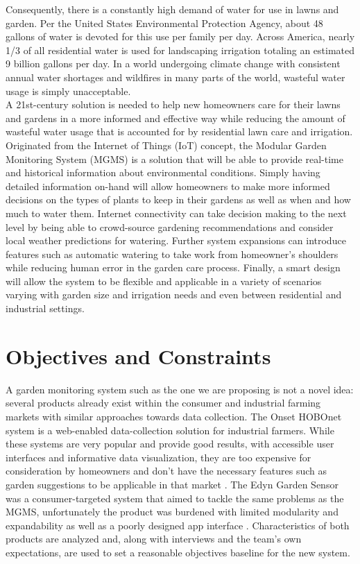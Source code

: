 \documentclass{report}
\begin{document}
Consequently, there is a constantly high demand of water for use in lawns and garden. Per the United States Environmental Protection Agency, about 48 gallons of water is devoted for this use per family per day. Across America, nearly 1/3 of all residential water is used for landscaping irrigation totaling an estimated 9 billion gallons per day\cite{epa_outdoor_nodate}. In a world undergoing climate change with consistent annual water shortages and wildfires in many parts of the world, wasteful water usage is simply unacceptable. \\

A 21st-century solution is needed to help new homeowners care for their lawns and gardens in a more informed and effective way while reducing the amount of wasteful water usage that is accounted for by residential lawn care and irrigation. \\

Originated from the Internet of Things (IoT) concept, the Modular Garden Monitoring System (MGMS) is a solution that will be able to provide real-time and historical information about environmental conditions. Simply having detailed information on-hand will allow homeowners to make more informed decisions on the types of plants to keep in their gardens as well as when and how much to water them. Internet connectivity can take decision making to the next level by being able to crowd-source gardening recommendations and consider local weather predictions for watering. Further system expansions can introduce features such as automatic watering to take work from homeowner's shoulders while reducing human error in the garden care process. Finally, a smart design will allow the system to be flexible and applicable in a variety of scenarios varying with garden size and irrigation needs and even between residential and industrial settings.
\chapter{Objectives and Constraints}

A garden monitoring system such as the one we are proposing is not a novel idea: several products already exist within the consumer and industrial farming markets with similar approaches towards data collection. The Onset HOBOnet system is a web-enabled data-collection solution for industrial farmers. While these systems are very popular and provide good results, with accessible user interfaces and informative data visualization, they are too expensive for consideration by homeowners and don’t have the necessary features such as garden suggestions to be applicable in that market \cite{onsethobo}. The Edyn Garden Sensor was a consumer-targeted system that aimed to tackle the same problems as the MGMS, unfortunately the product was burdened with limited modularity and expandability as well as a poorly designed app interface \cite{edyn}. Characteristics of both products are analyzed and, along with interviews and the team’s own expectations, are used to set a reasonable objectives baseline for the new system.
\end{document}

